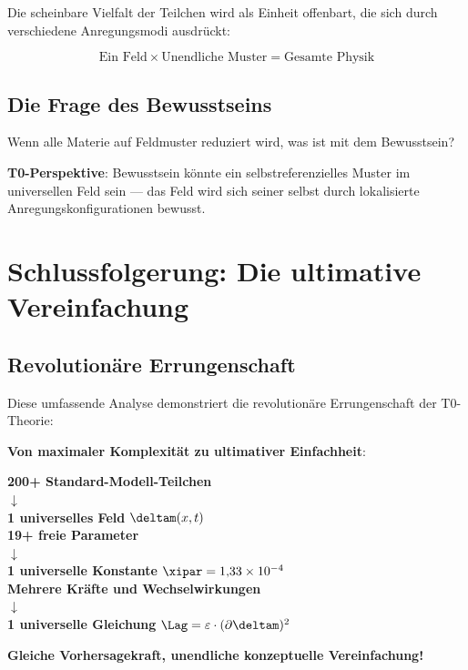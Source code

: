 	Die scheinbare Vielfalt der Teilchen wird als Einheit offenbart, die sich durch verschiedene Anregungsmodi ausdrückt:
	
	\begin{equation}
		\boxed{\text{Ein Feld} \times \text{Unendliche Muster} = \text{Gesamte Physik}}
		\label{eq:ultimate_unity}
	\end{equation}
	
	\subsection{Die Frage des Bewusstseins}
	
	Wenn alle Materie auf Feldmuster reduziert wird, was ist mit dem Bewusstsein?
	
	\textbf{T0-Perspektive}: Bewusstsein könnte ein selbstreferenzielles Muster im universellen Feld sein --- das Feld wird sich seiner selbst durch lokalisierte Anregungskonfigurationen bewusst.
	
	\section{Schlussfolgerung: Die ultimative Vereinfachung}
	
	\subsection{Revolutionäre Errungenschaft}
	
	Diese umfassende Analyse demonstriert die revolutionäre Errungenschaft der T0-Theorie:
	
	\begin{tcolorbox}[colback=green!5!white,colframe=green!75!black,title=Die vollständige Vereinheitlichung]
		\textbf{Von maximaler Komplexität zu ultimativer Einfachheit}:
		
		\begin{center}
			\textbf{200+ Standard-Modell-Teilchen} \\
			$\downarrow$ \\
			\textbf{1 universelles Feld} $\deltam(x,t)$ \\[1em]
			
			\textbf{19+ freie Parameter} \\
			$\downarrow$ \\
			\textbf{1 universelle Konstante} $\xipar = 1{,}33 \times 10^{-4}$ \\[1em]
			
			\textbf{Mehrere Kräfte und Wechselwirkungen} \\
			$\downarrow$ \\
			\textbf{1 universelle Gleichung} $\Lag = \varepsilon \cdot (\partial \deltam)^2$
		\end{center}
		
		\textbf{Gleiche Vorhersagekraft, unendliche konzeptuelle Vereinfachung!}
	\end{tcolorbox}
	
